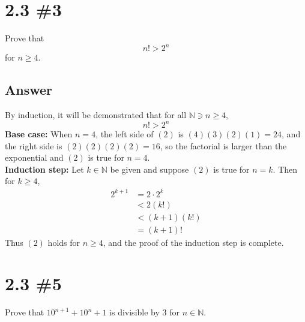 \documentclass[
	12pt, %
]{fphw}
\newcommand\qed{\text{$\blacksquare$}}
\newcommand\N{\mathbb{N}}
\begin{document}
\section*{2.3 \#3}

\begin{problem}
Prove that
$$
n! > 2^n
$$
for $n \ge 4$.
\end{problem}


\subsection*{Answer} By induction, it will be demonstrated that for all $\N{} \ni n \ge 4$,
\begin{equation} \label{eq1}
n! > 2^n
\end{equation}
\textbf{Base case:} When $n = 4$, the left side of $(2)$ is $(4)(3)(2)(1) = 24$, and the right side is $(2)(2)(2)(2) = 16$, so the factorial is larger than the exponential and $(2)$ is true for $n=4$.\\
\textbf{Induction step:} Let $k \in \N{}$ be given and suppose $(2)$ is true for $n = k$. Then for $k \ge 4$,
\begin{align*}
2^{k+1} &= 2 \cdot 2^k\\
&< 2(k!)\\
&< (k+1)(k!)\\
&= (k+1)!
\end{align*}
Thus $(2)$ holds for $n \ge 4$, and the proof of the induction step is complete. \qed


\section*{2.3 \#5}

\begin{problem}
Prove that $10^{n+1} + 10^n + 1$ is divisible by 3 for $n \in \N{}$.
\end{problem}

\end{document}
